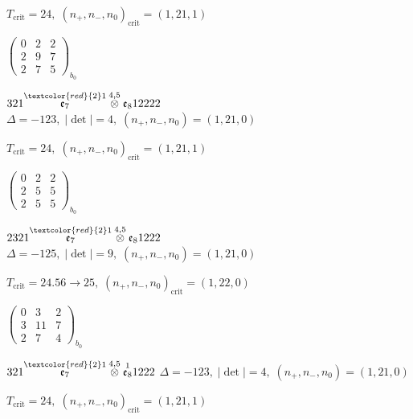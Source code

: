 \documentclass[10pt]{article}
\begin{document}
\hspace{1em}$T_{\text{crit}}=24,\; (n_+,n_-,n_0)_{\text{crit}}=(1,21,1)$

\hspace{2em}$\left(\begin{smallmatrix}0 & 2 & 2 \\ 2 & 9 & 7 \\ 2 & 7 & 5\end{smallmatrix}\right)_{\!b_0}$

\smallskip

$321\overset{\textcolor{red}{2}1}{\mathfrak{e}_7}\overset{4,5}{\otimes}\mathfrak{e}_812222$ \quad $\Delta=-123,\; |\det|=4,\; (n_+,n_-,n_0)=(1,21,0)$

\hspace{1em}$T_{\text{crit}}=24,\; (n_+,n_-,n_0)_{\text{crit}}=(1,21,1)$

\hspace{2em}$\left(\begin{smallmatrix}0 & 2 & 2 \\ 2 & 5 & 5 \\ 2 & 5 & 5\end{smallmatrix}\right)_{\!b_0}$

\smallskip

$2321\overset{\textcolor{red}{2}1}{\mathfrak{e}_7}\overset{4,5}{\otimes}\mathfrak{e}_81222$ \quad $\Delta=-125,\; |\det|=9,\; (n_+,n_-,n_0)=(1,21,0)$

\hspace{1em}$T_{\text{crit}}=24.56 \to 25,\; (n_+,n_-,n_0)_{\text{crit}}=(1,22,0)$

\hspace{2em}$\left(\begin{smallmatrix}0 & 3 & 2 \\ 3 & 11 & 7 \\ 2 & 7 & 4\end{smallmatrix}\right)_{\!b_0}$

\smallskip

$321\overset{\textcolor{red}{2}1}{\mathfrak{e}_7}\overset{4,5}{\otimes}\overset{1}{\mathfrak{e}_8}1222$ \quad $\Delta=-123,\; |\det|=4,\; (n_+,n_-,n_0)=(1,21,0)$

\hspace{1em}$T_{\text{crit}}=24,\; (n_+,n_-,n_0)_{\text{crit}}=(1,21,1)$
\end{document}
